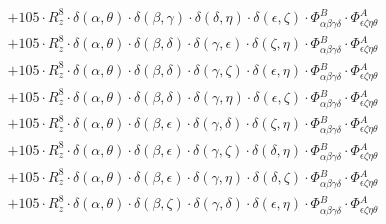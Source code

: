 \documentclass{article}
\begin{document}
\begin{equation}
\begin{array}{c}
 \\[0.2em] 		 + 105 \cdot R_{z}^{8} \cdot \delta{}\left(\alpha{}, \theta{}\right) \cdot \delta{}\left(\beta{}, \gamma{}\right) \cdot \delta{}\left(\delta{}, \eta{}\right) \cdot \delta{}\left(\epsilon{}, \zeta{}\right) \cdot \Phi{}^{B}_{\alpha{}\beta{}\gamma{}\delta{}} \cdot \Phi{}^{A}_{\epsilon{}\zeta{}\eta{}\theta{}} 
 \\[0.2em] 		 + 105 \cdot R_{z}^{8} \cdot \delta{}\left(\alpha{}, \theta{}\right) \cdot \delta{}\left(\beta{}, \delta{}\right) \cdot \delta{}\left(\gamma{}, \epsilon{}\right) \cdot \delta{}\left(\zeta{}, \eta{}\right) \cdot \Phi{}^{B}_{\alpha{}\beta{}\gamma{}\delta{}} \cdot \Phi{}^{A}_{\epsilon{}\zeta{}\eta{}\theta{}} 
 \\[0.2em] 		 + 105 \cdot R_{z}^{8} \cdot \delta{}\left(\alpha{}, \theta{}\right) \cdot \delta{}\left(\beta{}, \delta{}\right) \cdot \delta{}\left(\gamma{}, \zeta{}\right) \cdot \delta{}\left(\epsilon{}, \eta{}\right) \cdot \Phi{}^{B}_{\alpha{}\beta{}\gamma{}\delta{}} \cdot \Phi{}^{A}_{\epsilon{}\zeta{}\eta{}\theta{}} 
 \\[0.2em] 		 + 105 \cdot R_{z}^{8} \cdot \delta{}\left(\alpha{}, \theta{}\right) \cdot \delta{}\left(\beta{}, \delta{}\right) \cdot \delta{}\left(\gamma{}, \eta{}\right) \cdot \delta{}\left(\epsilon{}, \zeta{}\right) \cdot \Phi{}^{B}_{\alpha{}\beta{}\gamma{}\delta{}} \cdot \Phi{}^{A}_{\epsilon{}\zeta{}\eta{}\theta{}} 
 \\[0.2em] 		 + 105 \cdot R_{z}^{8} \cdot \delta{}\left(\alpha{}, \theta{}\right) \cdot \delta{}\left(\beta{}, \epsilon{}\right) \cdot \delta{}\left(\gamma{}, \delta{}\right) \cdot \delta{}\left(\zeta{}, \eta{}\right) \cdot \Phi{}^{B}_{\alpha{}\beta{}\gamma{}\delta{}} \cdot \Phi{}^{A}_{\epsilon{}\zeta{}\eta{}\theta{}} 
 \\[0.2em] 		 + 105 \cdot R_{z}^{8} \cdot \delta{}\left(\alpha{}, \theta{}\right) \cdot \delta{}\left(\beta{}, \epsilon{}\right) \cdot \delta{}\left(\gamma{}, \zeta{}\right) \cdot \delta{}\left(\delta{}, \eta{}\right) \cdot \Phi{}^{B}_{\alpha{}\beta{}\gamma{}\delta{}} \cdot \Phi{}^{A}_{\epsilon{}\zeta{}\eta{}\theta{}} 
 \\[0.2em] 		 + 105 \cdot R_{z}^{8} \cdot \delta{}\left(\alpha{}, \theta{}\right) \cdot \delta{}\left(\beta{}, \epsilon{}\right) \cdot \delta{}\left(\gamma{}, \eta{}\right) \cdot \delta{}\left(\delta{}, \zeta{}\right) \cdot \Phi{}^{B}_{\alpha{}\beta{}\gamma{}\delta{}} \cdot \Phi{}^{A}_{\epsilon{}\zeta{}\eta{}\theta{}} 
 \\[0.2em] 		 + 105 \cdot R_{z}^{8} \cdot \delta{}\left(\alpha{}, \theta{}\right) \cdot \delta{}\left(\beta{}, \zeta{}\right) \cdot \delta{}\left(\gamma{}, \delta{}\right) \cdot \delta{}\left(\epsilon{}, \eta{}\right) \cdot \Phi{}^{B}_{\alpha{}\beta{}\gamma{}\delta{}} \cdot \Phi{}^{A}_{\epsilon{}\zeta{}\eta{}\theta{}} 

\end{array}
\end{equation}
\end{document}
